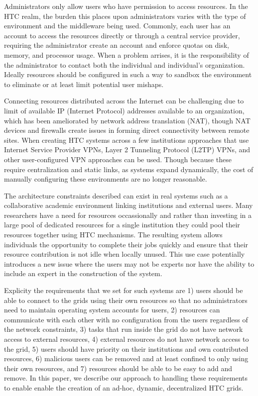 \documentclass{sig-alternate}
\begin{document}
Administrators only allow users who have permission to access resources.  In
the HTC realm, the burden this places upon administrators varies with the type
of environment and the middleware being used.  Commonly, each user has an
account to access the resources directly or through a central service provider,
requiring the administrator create an account and enforce quotas on disk,
memory, and processor usage.  When a problem arrises, it is the responsibility
of the administrator to contact both the individual and individual's
organization.  Ideally resources should be configured in such a way to sandbox
the environment to eliminate or at least limit potential user mishaps.

Connecting resources distributed across the Internet can be challenging due to
limit of available IP (Internet Protocol) addresses available to an
organization, which has been ameliorated by network address translation (NAT),
though NAT devices and firewalls create issues in forming direct connectivity
between remote sites.  When creating HTC systems across a few institutions
approaches that use Internet Service Provider VPNs, Layer 2 Tunneling Protocol
(L2TP) VPNs, and other user-configured VPN approaches can be used.  Though
because these require centralization and static links, as systems expand
dynamically, the cost of manually configuring these environments are no longer
reasonable.

The architecture constraints described can exist in real systems such as a
collaborative academic environment linking institutions and external users.
Many researchers have a need for resources occassionally and rather than
investing in a large pool of dedicated resources for a single institution they
could pool their resources together using HTC mechanisms.  The resulting system
allows individuals the opportunity to complete their jobs quickly and ensure
that their resource contribution is not idle when locally unused.  This use
case potentially introduces a new issue where the users may not be experts nor
have the ability to include an expert in the construction of the system.

Explicity the requirements that we set for such systems are 1) users should
be able to connect to the grids using their own resources so that no
administrators need to maintain operating system accounts for users, 2)
resources can communicate with each other with no configuration from the users
regardless of the network constraints, 3) tasks that run inside the grid do not
have network access to external resources, 4) external resources do not have
network access to the grid, 5) users should have priority on their institutions
and own contributed resources, 6) malicious users can be removed and at least
confined to only using their own resources, and 7) resources should be able to
be easy to add and remove.  In this paper, we describe our approach to handling
these requirements to enable enable the creation of an ad-hoc, dynamic,
decentralized HTC grids.
\end{document}
